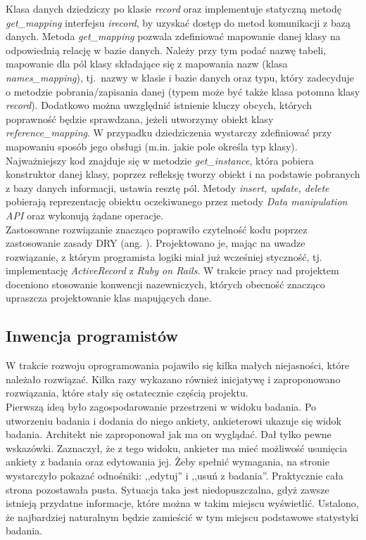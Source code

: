 Klasa danych dziedziczy po klasie \textit{record} oraz implementuje statyczną metodę \textit{get\_mapping} interfejsu \textit{irecord}, by uzyskać dostęp do metod komunikacji z bazą danych. Metoda \textit{get\_mapping} pozwala zdefiniować mapowanie danej klasy na odpowiednią relację w bazie danych. Należy przy tym podać nazwę tabeli, mapowanie dla pól klasy składające się z mapowania nazw (klasa \textit{names\_mapping}), tj.~nazwy w klasie i bazie danych oraz typu, który zadecyduje o metodzie pobrania/zapisania danej (typem może być także klasa potomna klasy \textit{record}). Dodatkowo można uwzględnić istnienie kluczy obcych, których poprawność będzie sprawdzana, jeżeli utworzymy obiekt klasy \textit{reference\_mapping}. W przypadku dziedziczenia wystarczy zdefiniować przy mapowaniu sposób jego obsługi (m.in. jakie pole określa typ klasy). Najważniejszy kod znajduje się w metodzie \textit{get\_instance}, która pobiera konstruktor danej klasy, poprzez refleksję tworzy obiekt i na podstawie pobranych z bazy danych informacji, ustawia resztę pól. Metody \textit{insert, update, delete} pobierają reprezentację obiektu oczekiwanego przez metody \textit{Data manipulation API} oraz wykonują żądane operacje.\\
Zastosowane rozwiązanie znacząco poprawiło czytelność kodu poprzez zastosowanie zasady DRY (ang. ). Projektowano je, mając na uwadze rozwiązanie, z którym programista logiki miał już wcześniej styczność, tj. implementację \textit{ActiveRecord} z \textit{Ruby on Rails}. W trakcie pracy nad projektem doceniono stosowanie konwencji nazewniczych, których obecność znacząco upraszcza projektowanie klas mapujących dane.

\subsection{Inwencja programistów}
\label{Chapter62d}

W trakcie rozwoju oprogramowania pojawiło się kilka małych niejasności, które należało rozwiązać. Kilka razy wykazano również inicjatywę i zaproponowano rozwiązania, które stały się ostatecznie częścią projektu. \\

Pierwszą ideą było zagospodarowanie przestrzeni w widoku badania. Po utworzeniu badania i dodania do niego ankiety, ankieterowi ukazuje się widok badania. Architekt nie zaproponował jak ma on wyglądać. Dał tylko pewne wskazówki. Zaznaczył, że z tego widoku, ankieter ma mieć możliwość usunięcia ankiety z badania oraz edytowania jej. Żeby spełnić wymagania, na stronie wystarczyło pokazać odnośniki: ,,edytuj'' i ,,usuń z badania''. Praktycznie cała strona pozostawała pusta. Sytuacja taka jest niedopuszczalna, gdyż zawsze istnieją przydatne informacje, które można w takim miejscu wyświetlić. Ustalono, że najbardziej naturalnym będzie zamieścić w tym miejscu podstawowe statystyki badania. \\

